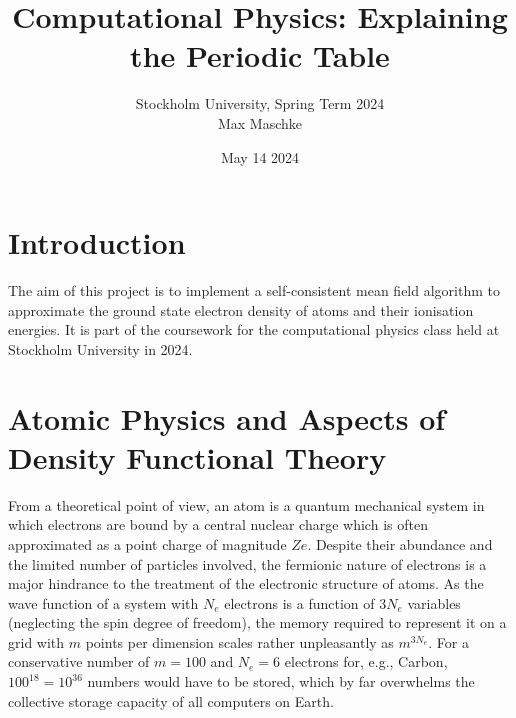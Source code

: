 \documentclass[a4paper,DIV=12,english]{scrartcl}
\title{Computational Physics: Explaining the Periodic Table}
\author{Stockholm University, Spring Term 2024 \\Max Maschke}
\date{May 14 2024}
\begin{document}
\maketitle


\tableofcontents
\newpage


\newpage
\section{Introduction}The aim of this project is to implement a self-consistent mean field algorithm to approximate the ground state electron density of atoms and their ionisation energies. It is part of the coursework for the computational physics class held at Stockholm University in 2024.

\section{Atomic Physics and Aspects of Density Functional Theory}
From a theoretical point of view, an atom is a quantum mechanical system in which electrons are bound by a central nuclear charge which is often approximated as a point charge of magnitude $Ze$. Despite their abundance and the limited number of particles involved, the fermionic nature of electrons is a major hindrance to the treatment of the electronic structure of atoms. As the wave function of a system with $N_e$ electrons is a function of $3N_e$ variables (neglecting the spin degree of freedom), the memory required to represent it on a grid with $m$ points per dimension scales rather unpleasantly as $m^{3N_e}$. For a conservative number of $m=100$ and $N_e=6$ electrons for, e.g., Carbon, $100^{18}=10^{36}$ numbers would have to be stored, which by far overwhelms the collective storage capacity of all computers on Earth. %
\end{document}
